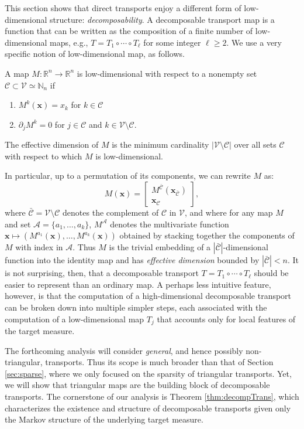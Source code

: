 \documentclass[twoside,11pt]{article}
\newcommand{\re}{\mathbb{R}}
\newcommand{\ra}{\rightarrow}
\newcommand{\Cc}{\mathcal{C}}
\newcommand{\Vc}{\mathcal{V}}
\newcommand{\Ac}{\mathcal{A}}
\newcommand{\xb}{\boldsymbol{x}}
\begin{document}
This section shows that direct transports enjoy a different form of
low-dimensional structure: \textit{decomposability}.
%
A decomposable transport map is a function that can be written as the
composition of a finite number of low-dimensional maps, e.g., 
$T=T_1\circ \cdots \circ T_\ell$ for some integer $\ell \ge 2$.
We use a very specific notion of low-dimensional map, as follows.
%
%
%
\begin{definition} \label{def:lowdim}
%
%
A map $M : \re^n \ra \re^n$ is low-dimensional with respect to a
nonempty set $\Cc \subset \Vc \simeq \mathbb{N}_n$ if
\begin{enumerate} 
  \item  $M^k(\xb)=x_k$ for $k \in \Cc$
  \smallskip
%
  \item $\partial_j M^k = 0$ for $j\in \Cc$ and $k \in \Vc \setminus \Cc$.
\end{enumerate}
%
%
%
The effective dimension  of $M$ is the minimum 
cardinality $|\Vc \setminus \Cc|$ over all sets $\Cc$ 
with respect to %
which $M$
is low-dimensional.
\end{definition}
%
%
In particular,  
up to a permutation of its components, we can rewrite $M$ as:
\begin{equation}   
M( \xb ) = 
%
\left[\begin{array}{l}
M^{ \bar{\Cc}}( \xb_{\bar{\Cc}} )\\%
\xb_{\Cc} 
\end{array}\right],
\end{equation}
%
%
%
%
%
%
where $\bar{\Cc} = \Vc \setminus \Cc$ denotes the complement of
$\Cc$ in $\Vc$, and where for any map $M$ and set $\Ac=\{a_1,\ldots,a_k\}$, $M^{\Ac}$ denotes the multivariate
function $\xb \mapsto (M^{a_1}(\xb),\ldots,M^{a_k}(\xb))$ obtained by stacking together
the components of $M$ with index in $\Ac$.
Thus $M$ is the trivial embedding of a $|\bar{\Cc}|$-dimensional function  
into the identity map and  has
{\it effective dimension} bounded by $|\bar{\Cc}|<n$. 
It is not surprising, then, that a decomposable transport $T=T_1\circ \cdots \circ T_\ell$
should be easier to represent than an ordinary map.
A perhaps less intuitive feature, however, 
is that the computation of a high-dimensional decomposable
transport can
be broken down into multiple simpler
steps, each associated with the computation of a low-dimensional map
$T_j$ that accounts only for local features of the target measure. %
%

%
%
%
%
%
%
%
%
%
%
%
%
%
%
%
%
%
%
%
%
%
%
The forthcoming analysis will consider \textit{general}, and hence
possibly non-triangular, transports. Thus its scope is much broader
than that of Section \ref{sec:sparse}, where we only focused on the %
sparsity of triangular transports.
%
Yet, we will show that  triangular maps
are the building block of decomposable transports.
The cornerstone of our analysis is
%
Theorem \ref{thm:decompTrans}, which characterizes the existence and
structure of decomposable transports given only the Markov structure
of the underlying target measure. 
%
%
%
%
%
%
%
%
%
%
%
%
%
\end{document}

